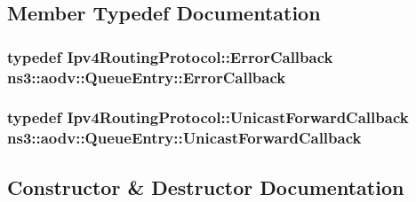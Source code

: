 \subsection{Member Typedef Documentation}
\subsubsection[{\texorpdfstring{Error\+Callback}{ErrorCallback}}]{\setlength{\rightskip}{0pt plus 5cm}typedef {\bf Ipv4\+Routing\+Protocol\+::\+Error\+Callback} {\bf ns3\+::aodv\+::\+Queue\+Entry\+::\+Error\+Callback}}\hypertarget{classns3_1_1aodv_1_1QueueEntry_a0a8a6e41579672fb47dc7c9c7cbaf528}{}\label{classns3_1_1aodv_1_1QueueEntry_a0a8a6e41579672fb47dc7c9c7cbaf528}
\subsubsection[{\texorpdfstring{Unicast\+Forward\+Callback}{UnicastForwardCallback}}]{\setlength{\rightskip}{0pt plus 5cm}typedef {\bf Ipv4\+Routing\+Protocol\+::\+Unicast\+Forward\+Callback} {\bf ns3\+::aodv\+::\+Queue\+Entry\+::\+Unicast\+Forward\+Callback}}\hypertarget{classns3_1_1aodv_1_1QueueEntry_ac0f936aaa2d2de7ba253755b56cecc65}{}\label{classns3_1_1aodv_1_1QueueEntry_ac0f936aaa2d2de7ba253755b56cecc65}


\subsection{Constructor \& Destructor Documentation}
